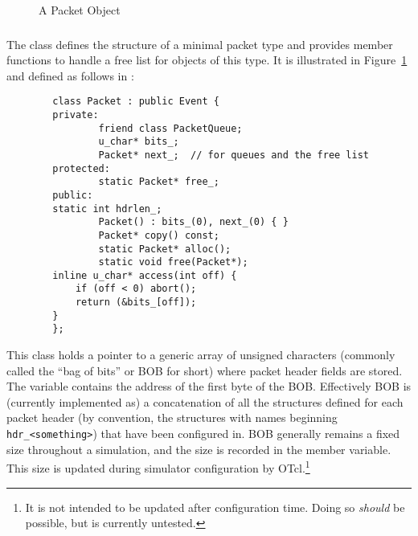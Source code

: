 \begin{figure}[h]
\centerline{}
\caption{\label{pic:packet}A Packet Object}
\end{figure}

\subsubsection{}

The  class defines the structure of a minimal
packet type and provides member functions to handle a
free list for objects of this type.
It is illustrated in Figure~\ref{pic:packet} and
defined as follows in :
\begin{small}
\begin{verbatim}
        class Packet : public Event {
        private:
                friend class PacketQueue;
                u_char* bits_;
                Packet* next_;  // for queues and the free list
        protected:
                static Packet* free_;
        public:
		static int hdrlen_;
                Packet() : bits_(0), next_(0) { }
                Packet* copy() const;
                static Packet* alloc();
                static void free(Packet*);
		inline u_char* access(int off) {
			if (off < 0) abort();
			return (&bits_[off]);
		}
        };
\end{verbatim}
\end{small}
This class holds a pointer to a generic array of unsigned
characters (commonly called the ``bag of bits'' or BOB for short)
where packet header fields are stored.
The  variable contains the address of
the first byte of the BOB.
Effectively BOB is (currently implemented as) a concatenation
of all the structures defined for each packet header (by convention,
the structures with names beginning {\tt hdr\_<something>}) that have
been configured in.
BOB generally remains a fixed size throughout a simulation, and
the size is recorded in the  member
variable.
This size is updated during simulator configuration by
OTcl.\footnote{It is not intended to be updated after configuration
time.  Doing so {\em should} be possible, but is currently untested.}

